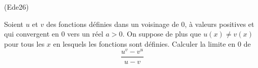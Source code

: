 \begin{tiny}(Ede26)\end{tiny} Soient $u$ et $v$ des fonctions définies dans un voisinage de $0$, à valeurs positives et qui convergent en $0$ vers un réel $a>0$. On suppose de plus que $u(x)\neq v(x)$ pour tous les $x$ en lesquels les fonctions sont définies. Calculer la limite en $0$ de
\begin{displaymath}
  \frac{u^v - v^u}{u-v}
\end{displaymath}
